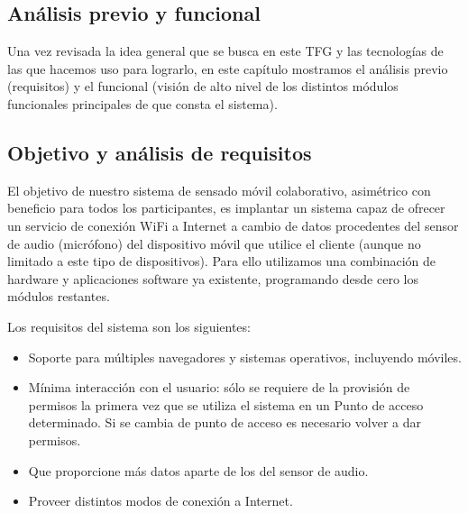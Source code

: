 \clearpage
{}%
\begin{center}
\begin{minipage}{.75\textwidth}
\section{Análisis previo y funcional}

Una vez revisada la idea general que se busca en este TFG y las tecnologías de las que hacemos uso para lograrlo, en este capítulo mostramos el análisis previo (requisitos) y el funcional (visión de alto nivel de los distintos módulos funcionales principales de que consta el sistema). %
\end{minipage}
\end{center}
\clearpage%

\sloppy
\subsection{Objetivo y análisis de requisitos}
El objetivo de nuestro sistema de sensado móvil colaborativo, asimétrico con beneficio para todos los participantes, es implantar un sistema capaz de ofrecer un servicio de conexión WiFi a Internet a cambio de datos procedentes del sensor de audio (micrófono) del dispositivo móvil que utilice el cliente (aunque no limitado a este tipo de dispositivos). Para ello utilizamos una combinación de hardware y aplicaciones software ya existente, programando desde cero los módulos restantes.

Los requisitos del sistema son los siguientes:

\begin{itemize}
\item Soporte para múltiples navegadores y sistemas operativos, incluyendo móviles.
\item Mínima interacción con el usuario: sólo se requiere de la provisión de permisos la primera vez que se utiliza el sistema en un Punto de acceso determinado. Si se cambia de punto de acceso es necesario volver a dar permisos.
\item Que proporcione más datos aparte de los del sensor de audio.
\item Proveer distintos modos de conexión a Internet.
\end{itemize}

